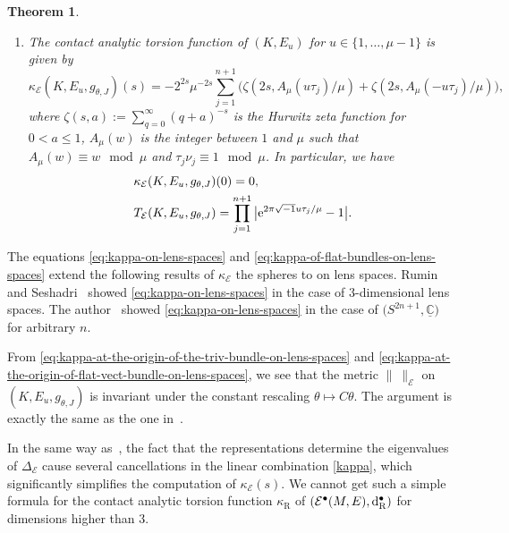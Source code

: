 \documentclass[pdftex]{sigma}
\numberwithin{equation}{section}
\newtheorem{Theorem}{Theorem}[section]
\newcommand{\ii}{\sqrt{-1}}
\newcommand{\Rumin}{\mathrm{R}}
\newcommand{\RN}{\cE}
\newcommand{\bC}{\mathbb{C}}
\newcommand{\cE}{\mathcal{E}}
\begin{document}
\begin{Theorem}
\begin{enumerate}
\item[$(2)$]
 The contact analytic torsion function
 of $(K, E_{u})$
 for $u \in \{ 1, \ldots , \mu -1 \} $
 is given by
 \begin{equation}
 \label{eq:kappa-of-flat-bundles-on-lens-spaces}
 \kappa_\RN ( K , E_{u}, g_{\theta , J} ) (s)
 =
 -2^{2s} \mu^{-2s}
 \sum_{j=1}^{n+1}
 \bigl(
 \zeta ( 2s , A_{\mu} (u {\tau}_j) / \mu )
 +
 \zeta ( 2s , A_{\mu} (- u {\tau}_j) / \mu )
 \bigr)
 ,
 \end{equation}
 where $\zeta (s , a) := \sum_{q=0}^{\infty} (q +a )^{-s}$ is the Hurwitz zeta function for $0 < a \leq 1$, $A_{\mu} ( w )$ is the integer between $1$ and $\mu$
 such that $A_{\mu} ( w ) \equiv w \mod \mu$
 and ${\tau}_j \nu_j \equiv 1 \mod \mu$.
 In particular, we have
 \begin{align}
 & \kappa_\RN ( K , E_{u}, g_{\theta , J} ) (0)
 =
 0
 ,
 \label{eq:kappa-at-the-origin-of-flat-vect-bundle-on-lens-spaces}
 \\
 & T_\RN ( K , E_{u}, g_{\theta , J} )
 =
 \prod_{j=1}^{n+1} \big| {\rm e}^{ 2 \pi \ii u {\tau}_j / \mu } -1 \big|
 .
 \label{eq:Rumin-analytic-torsion-of-flat-vect-bundle-on-lens-spaces}
 \end{align}
\end{enumerate}
\end{Theorem}


The equations \eqref{eq:kappa-on-lens-spaces} and \eqref{eq:kappa-of-flat-bundles-on-lens-spaces} extend the following results of $\kappa_{\RN}$ the spheres to on lens spaces.
Rumin and Seshadri~\cite[Theorem 5.4]{Rumin-Seshadri-12} showed \eqref{eq:kappa-on-lens-spaces} in the case of 3-dimensional lens spaces.
The author~\cite{Kitaoka-19} showed \eqref{eq:kappa-on-lens-spaces} in the case of $\big(S^{2n+1}, \underline{\bC}\big)$ for arbitrary $n$.

From \eqref{eq:kappa-at-the-origin-of-the-triv-bundle-on-lens-spaces} and \eqref{eq:kappa-at-the-origin-of-flat-vect-bundle-on-lens-spaces},
we see that
the metric $\| \ \|_\RN $ on $( K, E_{u} , g_{\theta , J} )$ is invariant under the constant rescaling $\theta \mapsto C \theta$.
The argument is exactly the same as the one in~\cite{Rumin-Seshadri-12}.

In the same way as~\cite{Kitaoka-19},
the fact that the representations determine the eigenvalues of $\Delta_\RN$ cause several cancellations in the linear combination \eqref{kappa}, which significantly simplifies the computation of $\kappa_\RN (s)$.
We cannot get such a simple formula for the contact analytic torsion function $\kappa_{\Rumin}$ of $(\cE ^\bullet (M,E), {\rm d}_{\Rumin}^\bullet)$
for dimensions higher than $3$.
\end{document}
